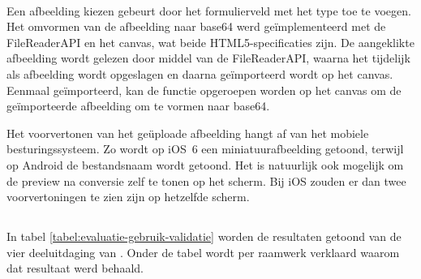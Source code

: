 \paragraph{\lungo}
Een afbeelding kiezen gebeurt door het formulierveld met het type  toe te voegen.
Het omvormen van de afbeelding naar base64 werd geïmplementeerd met de FileReaderAPI en het canvas, wat beide HTML5-specificaties zijn. 
De aangeklikte afbeelding wordt gelezen door middel van de FileReaderAPI, waarna het tijdelijk als afbeelding wordt opgeslagen en daarna geïmporteerd wordt op het canvas. 
Eenmaal geïmporteerd, kan de functie  opgeroepen worden op het canvas om de geïmporteerde afbeelding om te vormen naar base64. 

Het voorvertonen van het geüploade afbeelding hangt af van het mobiele besturingssysteem.
Zo wordt op iOS~6 een miniatuurafbeelding getoond, terwijl op Android de bestandsnaam wordt getoond.
Het is natuurlijk ook mogelijk om de preview na conversie zelf te tonen op het scherm.
Bij iOS zouden er dan twee voorvertoningen te zien zijn op hetzelfde scherm.


\subsection{}
\label{sec:evaluatie-gebruik-validatie}

In tabel \ref{tabel:evaluatie-gebruik-validatie} worden de resultaten getoond van de vier deeluitdaging van .
Onder de tabel wordt per raamwerk verklaard waarom dat resultaat werd behaald.


\begin{table}[H]
\centering
{}
\caption{Gebruik van  voor \st{}~(\sta), \kendo{}~(\kendoa), \jqm{}~(\jqma) en \lungo{}~(\lungoa).}
\label{tabel:evaluatie-gebruik-validatie}
\end{table}

